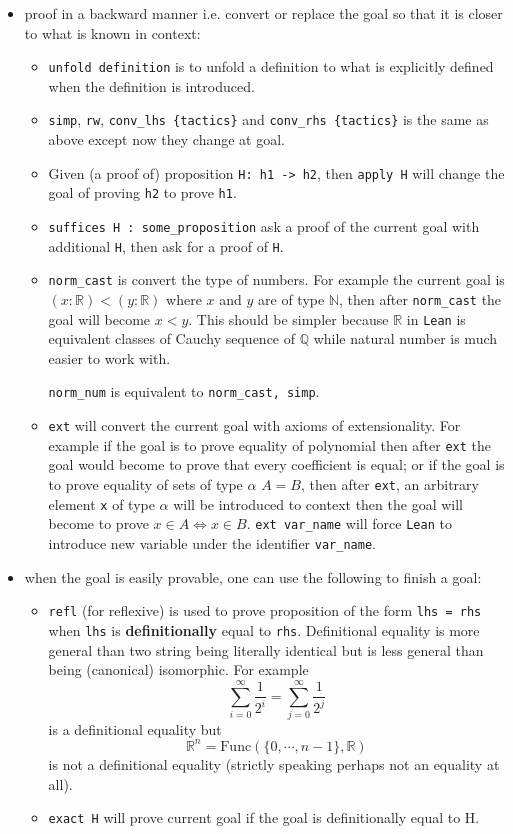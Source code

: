 \documentclass{report}
\theoremstyle{definition}
\theoremstyle{plain}
\begin{document}
\begin{itemize}
  \item proof in a backward manner i.e. convert or replace the goal so that it is closer to what is known in context:
  \begin{itemize}
    \item {\tt unfold definition} is to unfold a definition to what is explicitly defined when the definition is introduced.
    \item {\tt simp}, {\tt rw}, {\tt conv\_lhs \{tactics\}} and {\tt conv\_rhs \{tactics\}} is the same as above except now they change at goal.
    \item Given (a proof of) proposition {\tt H: h1 -> h2}, then {\tt apply H} will change the goal of proving {\tt h2} to prove {\tt h1}.
    \item {\tt suffices H : some\_proposition} ask a proof of the current goal with additional {\tt H}, then ask for a proof of {\tt H}.
    \item {\tt norm\_cast} is convert the type of numbers. For example the current goal is $(x:\mathbb R)<(y:\mathbb R)$ where $x$ and $y$ are of type $\mathbb N$, then after {\tt norm\_cast} the goal will become $x<y$. This should be simpler because $\mathbb R$ in {\tt Lean} is equivalent classes of Cauchy sequence of $\mathbb Q$ while natural number is much easier to work with.
    
    {\tt norm\_num} is equivalent to {\tt norm\_cast, simp}.

    \item {\tt ext} will convert the current goal with axioms of extensionality. For example if the goal is to prove equality of polynomial then after {\tt ext} the goal would become to prove that every coefficient is equal; or if the goal is to prove equality of sets of type $\alpha$ $A=B$, then after {\tt ext}, an arbitrary element {\tt x} of type $\alpha$ will be introduced to context then the goal will become to prove $x\in A\iff x\in B$. {\tt ext var\_name} will force {\tt Lean} to introduce new variable under the identifier {\tt var\_name}.
  \end{itemize}

  \item when the goal is easily provable, one can use the following to finish a goal:
  \begin{itemize}
    \item {\tt refl} (for reflexive) is used to prove proposition of the form {\tt lhs = rhs} when {\tt lhs} is {\bf definitionally} equal to {\tt rhs}. Definitional equality is more general than two string being literally identical but is less general than being (canonical) isomorphic. For example
    $$
  \sum_{i=0}^\infty \frac{1}{2^i}=\sum_{j=0}^\infty \frac{1}{2^j}
    $$
    is a definitional equality but
    $$
  \mathbb R^n = \mathrm{Func}\left(\{0,\cdots, n-1\},\mathbb R\right)
    $$ is not a definitional equality (strictly speaking perhaps not an equality at all).
    \item {\tt exact H} will prove current goal if the goal is definitionally equal to H. 
  

\end{itemize}
\end{itemize}
\end{document}
